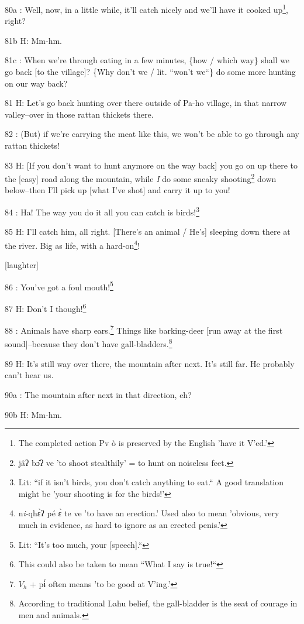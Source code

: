 80a  : Well, now, in a little while, it'll catch nicely and we'll have it cooked
up\footnote{The completed action Pv ò is preserved by the English 'have it V'ed.'}, right?

81b H: Mm-hm.

81c  : When we're through eating in a few minutes, \{how / which way\} shall we
go back [to the village]? \{Why don't we / lit. ``won't we``\}
do some more hunting on our way back?

81 H: Let's go back hunting over there outside of Pa-ho village, in that narrow
valley--over in those rattan thickets there.

82  : (But) if we're carrying the meat like this, we won't be able to go through
any rattan thickets!

83 H: [If you don't want to hunt anymore on the way back] you go on up there to
the [easy] road along the mountain, while \textit{I} do some sneaky shooting\footnote{jâʔ bɔ̂ʔ ve 'to shoot stealthily' = to hunt on noiseless feet.}
down below--then I'll pick up [what I've shot] and carry it up to you!

84  : Ha! The way you do it all you can catch is birds!\footnote{Lit: ``if it isn't birds, you don't catch anything to eat.`` A good translation might be 'your shooting is for the birds!'}

85 H: I'll catch him, all right. [There's an animal / He's] sleeping down there
at the river. Big as life, with a hard-on\footnote{n\emph{i}-qhɛ̀ʔ pé ɛ̀ te ve 'to have an erection.' Used also to mean 'obvious, very much in evidence, as hard to ignore as an erected penis.'}!

[laughter]

86  : You've got a foul mouth!\footnote{Lit: ``It's too much, your [speech].``}

87 H: Don't I though!\footnote{This could also be taken to mean ``What I say is true!``}

88  : Animals have sharp ears.\footnote{$V_h$ + pɨ́ often means 'to be good at V'ing.'} Things like barking-deer [run away at the first
sound]--because they don't have gall-bladders.\footnote{According to traditional Lahu belief, the gall-bladder is the seat of courage in men and animals.}

89 H: It's still way over there, the mountain after next. It's still far. He probably
can't hear us.

90a  : The mountain after next in that direction, eh?

90b H: Mm-hm.

